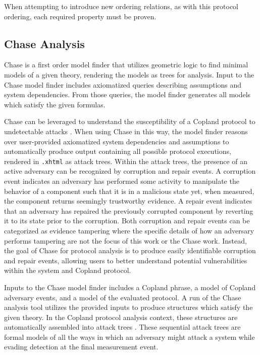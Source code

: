 \documentclass[runningheads]{llncs}
\theoremstyle{definition}
\begin{document}
\noindent When attempting to introduce new ordering relations, as with this protocol ordering, each required property must be proven.  

\subsection*{Chase Analysis}

Chase \cite{Ramsdell:2020:Chase,Rowe:2021:AutomatedTrust} is a first order model finder that utilizes geometric logic\cite{Enderton:logic} to find minimal models of a given theory, rendering the models as trees for analysis. Input to the Chase model finder includes axiomatized queries describing assumptions and system dependencies. From those queries, the model finder generates all models which satisfy the given formulas. 

Chase can be leveraged to understand the susceptibility of a Copland protocol to undetectable attacks \cite{Rowe:2021:AutomatedTrust}. When using Chase in this way, the model finder reasons over user-provided axiomatized system dependencies and assumptions to automatically produce output containing all possible protocol executions, rendered in \texttt{.xhtml} as attack trees. Within the attack trees, the presence of an active adversary can be recognized by corruption and repair events. A corruption event indicates an adversary has performed some activity to manipulate the behavior of a component such that it is in a malicious state yet, when measured, the component returns seemingly trustworthy evidence. A repair event indicates that an adversary has repaired the previously corrupted component by reverting it to its state prior to the corruption. Both corruption and repair events can be categorized as evidence tampering where the specific details of how an adversary performs tampering are not the focus of this work or the Chase work. Instead, the goal of Chase for protocol analysis is to produce easily identifiable corruption and repair events, allowing users to better understand potential vulnerabilities within the system and Copland protocol. 

Inputs to the Chase model finder includes a Copland phrase, a model of Copland adversary events, and a model of the evaluated protocol. A run of the Chase analysis tool utilizes the provided inputs to produce structures which satisfy the given theory. In the Copland protocol analysis context, these structures are automatically assembled into attack trees \cite{Rowe:2021:AutomatedTrust}. These sequential attack trees \cite{Horne:Attack, Jhaware:attack} are formal models of all the ways in which an adversary might attack a system while evading detection at the final measurement event. 
\end{document}
